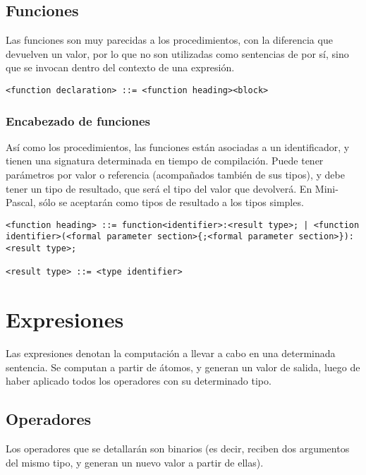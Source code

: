 \documentclass[a4paper,oneside]{report}
\begin{document}
\subsection{Funciones}

Las funciones son muy parecidas a los procedimientos, con la diferencia que devuelven un valor, por lo que no son utilizadas como sentencias de por sí, sino que se invocan dentro del contexto de una expresión.

\begin{verbatim}
<function declaration> ::= <function heading><block>
\end{verbatim}

\subsubsection{Encabezado de funciones}

Así como los procedimientos, las funciones están asociadas a un identificador, y tienen una signatura determinada en tiempo de compilación. Puede tener parámetros por valor o referencia (acompañados también de sus tipos), y debe tener un tipo de resultado, que será el tipo del valor que devolverá. En Mini-Pascal, sólo se aceptarán como tipos de resultado a los tipos simples.

\begin{verbatim}
<function heading> ::= function<identifier>:<result type>; | <function identifier>(<formal parameter section>{;<formal parameter section>}):<result type>;

<result type> ::= <type identifier>
\end{verbatim}

\section{Expresiones}


Las expresiones denotan la computación a llevar a cabo en una determinada sentencia. Se computan a partir de átomos, y generan un valor de salida, luego de haber aplicado todos los operadores con su determinado tipo.

\subsection{Operadores}

Los operadores que se detallarán son binarios (es decir, reciben dos argumentos del mismo tipo, y generan un nuevo valor a partir de ellas).
\end{document}
